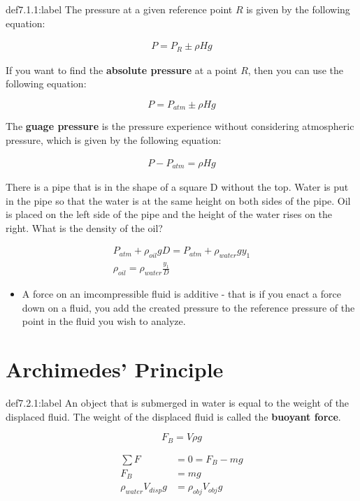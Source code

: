\begin{definition}{def7.1.1:label}
    The pressure at a given reference point $R$ is given by the following equation:

    \[
    \begin{aligned}
        P = P_R \pm \rho Hg
    \end{aligned}    
    \]

    If you want to find the \textbf{absolute pressure} at a point $R$, then you can use the following equation:

    \[
    P = P_{atm} \pm \rho Hg    
    \]

    The \textbf{guage pressure} is the pressure experience without considering atmospheric pressure, which is given by the following equation:

    \[
    \begin{aligned}
        P - P_{atm} = \rho Hg
    \end{aligned}    
    \]
\end{definition}


\begin{problem}
    There is a pipe that is in the shape of a square D without the top. Water is put in the pipe so that the water is at the same height on both sides of the pipe. Oil is placed on the left side of the pipe and the height of the water rises on the right. What is the density of the oil?

    \[
    \begin{aligned}
        P_{atm} + \rho_{oil}gD = P_{atm} + \rho_{water}gy_1\\
        \rho_{oil} = \rho_{water}\frac{y_1}{D}
    \end{aligned}    
    \]
\end{problem}

\begin{itemize}
    \item A force on an imcompressible fluid is additive - that is if you enact a force down on a fluid, you add the created pressure to the reference pressure of the point in the fluid you wish to analyze.
\end{itemize}


\section{Archimedes' Principle}

\begin{definition}{def7.2.1:label}
    An object that is submerged in water is equal to the weight of the displaced fluid. The weight of the displaced fluid is called the \textbf{buoyant force}.

    \[
    F_B = V\rho g    
    \]
\end{definition}

\begin{problem}
    \[
    \begin{aligned}
        \sum F &= 0 = F_B - mg\\
        F_B &= mg\\
        \rho_{water}V_{disp}g &= \rho_{obj}V_{obj}g
    \end{aligned}    
    \]
\end{problem}
